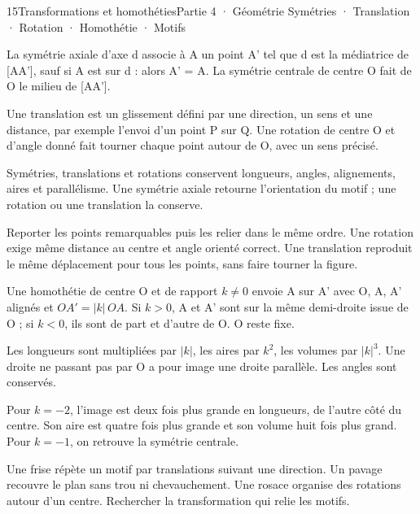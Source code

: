 \begin{ouverture}[geometrie]{15}{Transformations et homothéties}{Partie 4 · Géométrie}
{Symétries · Translation · Rotation · Homothétie · Motifs}
\end{ouverture}
\pagestyle{otMain}\essentiel\fontsize{11}{15}\selectfont
{}
\begin{definition}La symétrie axiale d’axe d associe à A un point A’ tel que d est la médiatrice de [AA’], sauf si A est sur d : alors A’ = A. La symétrie centrale de centre O fait de O le milieu de [AA’].\end{definition}
\begin{definition}Une translation est un glissement défini par une direction, un sens et une distance, par exemple l’envoi d’un point P sur Q. Une rotation de centre O et d’angle donné fait tourner chaque point autour de O, avec un sens précisé.\end{definition}
\begin{propriete}Symétries, translations et rotations conservent longueurs, angles, alignements, aires et parallélisme. Une symétrie axiale retourne l’orientation du motif ; une rotation ou une translation la conserve.\end{propriete}
\begin{savoirfaire}[Construire]Reporter les points remarquables puis les relier dans le même ordre. Une rotation exige même distance au centre et angle orienté correct. Une translation reproduit le même déplacement pour tous les points, sans faire tourner la figure.\end{savoirfaire}
\clearpage
{}
\begin{definition}Une homothétie de centre O et de rapport $k\ne0$ envoie A sur A’ avec O, A, A’ alignés et $OA'=|k|\,OA$. Si $k>0$, A et A’ sont sur la même demi-droite issue de O ; si $k<0$, ils sont de part et d’autre de O. O reste fixe.\end{definition}
\begin{propriete}Les longueurs sont multipliées par $|k|$, les aires par $k^2$, les volumes par $|k|^3$. Une droite ne passant pas par O a pour image une droite parallèle. Les angles sont conservés.\end{propriete}
\begin{exemple}Pour $k=-2$, l’image est deux fois plus grande en longueurs, de l’autre côté du centre. Son aire est quatre fois plus grande et son volume huit fois plus grand. Pour $k=-1$, on retrouve la symétrie centrale.\end{exemple}
\begin{savoirfaire}Une frise répète un motif par translations suivant une direction. Un pavage recouvre le plan sans trou ni chevauchement. Une rosace organise des rotations autour d’un centre. Rechercher la transformation qui relie les motifs.\end{savoirfaire}\label{cours-pavage}
\label{fig-cours-pavage}


